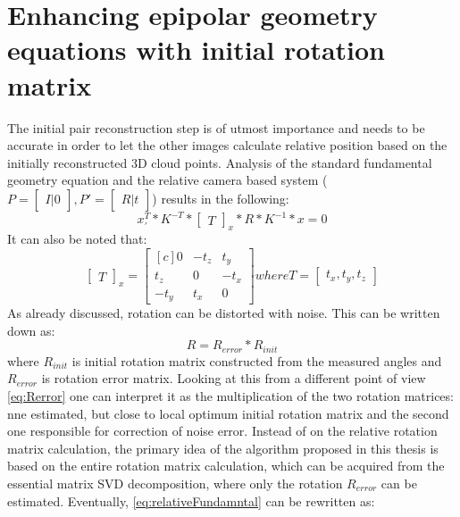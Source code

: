 \section{Enhancing epipolar geometry equations with initial rotation matrix}
The initial pair reconstruction step is of utmost importance and needs to be accurate in order to let the other images calculate relative position based on the initially reconstructed 3D cloud points.
Analysis of the standard fundamental geometry equation and the relative camera based system ($P = \begin{bmatrix}I |0\end{bmatrix}, P' = \begin{bmatrix}R|t\end{bmatrix}$) results in the following:
\begin{equation} \label{eq:relativeFundamntal}
{x}_{'}^{T} * K^{-T} * \begin{bmatrix}T\end{bmatrix}_{x} * R * K^{-1} * x = 0
\end{equation}
It can also be noted that:
\begin{equation} \label{eq:skewTranslation}
\begin{bmatrix}T\end{bmatrix}_{x} = 
\begin{bmatrix*}[c]
 0 & -t_{z} & t_{y}\\
 t_{z} & 0 & -t_{x}\\
-t_{y} & t_{x} & 0 
\end{bmatrix*} 
where T = \begin{bmatrix}t_{x},t_{y},t_{z}\end{bmatrix}
\end{equation}
As already discussed, rotation can be distorted with noise. This can be written down as:
\begin{equation} \label{eq:Rerror}
R = R_{error} * R_{init} 
\end{equation}
where $R_{init}$ is initial rotation matrix constructed from the measured angles and $R_{error}$ is rotation error matrix.
Looking at this from a different point of view \ref{eq:Rerror} one can interpret it as the multiplication of the two rotation matrices: 
nne estimated, but close to local optimum initial rotation matrix and the second one responsible for correction of noise error. 
Instead of on the relative rotation matrix calculation, the primary idea of the algorithm proposed in this thesis is based on the entire rotation matrix calculation, which can be acquired from the essential matrix SVD decomposition, where only the rotation $R_{error}$ can be estimated. Eventually, \ref{eq:relativeFundamntal} can be rewritten as:
